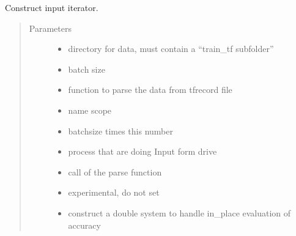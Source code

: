 \documentclass[letterpaper,10pt,english]{sphinxmanual}
\begin{document}
\begin{fulllineitems}
\label{\detokenize{neuralnet/inputs:inputs.input_iterator}}
Construct input iterator.
\begin{quote}\begin{description}
\item[{Parameters}] \leavevmode\begin{itemize}
\item {} 
 \textendash{} directory for data, must contain a
“train\_tf subfolder”

\item {} 
 \textendash{} batch size

\item {} 
 \textendash{} function to parse the data from tfrecord file

\item {} 
 \textendash{} name scope

\item {} 
 \textendash{} batchsize times this number

\item {} 
 \textendash{} process that are doing Input form drive

\item {} 
 \textendash{} call of the parse function

\item {} 
 \textendash{} experimental, do not set

\item {} 
 \textendash{} construct a double system to handle in\_place
evaluation of accuracy

\end{itemize}


\end{description}
\end{quote}
\end{fulllineitems}
\end{document}
